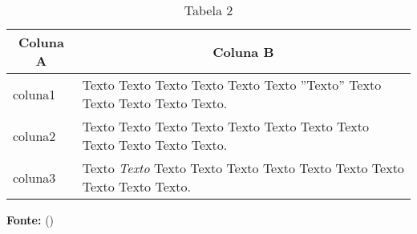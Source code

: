 

\begin{table}[ht]
\caption{Tabela 2}
\label{tbl:tabelaex2}
\centering
{}
\begin{tabular}{p{6cm}p{9cm}}
\hline
\multicolumn{1}{c}{\textbf{Coluna A}} & \multicolumn{1}{c}{\textbf{Coluna B}}  \\
\hline 
coluna1 & Texto Texto Texto Texto Texto Texto ''Texto'' Texto Texto Texto Texto Texto.
\\ 

coluna2 & Texto Texto Texto Texto Texto Texto Texto Texto Texto Texto Texto Texto.              
\\

coluna3 & Texto \textit{Texto} Texto Texto Texto Texto Texto Texto Texto Texto Texto Texto.     
\\ \hline

\end{tabular}

  \par\medskip\ABNTEXfontereduzida\selectfont\textbf{Fonte:} \citeauthor{manualufpe2020} (\citeyear{manualufpe2020}) \par\medskip
\end{table}
